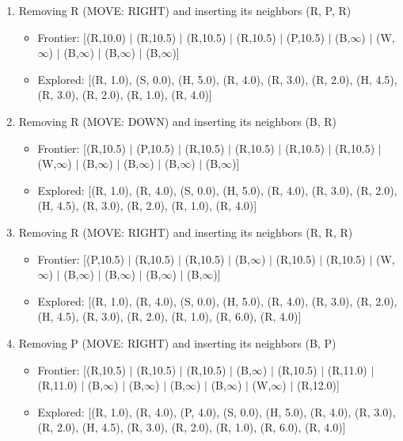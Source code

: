 \documentclass[12pt]{article}
\begin{document}
\begin{enumerate}
\item Removing R (MOVE: RIGHT) and inserting its neighbors (R, P, R)
\begin{itemize}
\item Frontier: [(R,10.0) \(|\) (R,10.5) \(|\) (R,10.5) \(|\) (R,10.5) \(|\) (P,10.5) \(|\) (B,\(\infty\)) \(|\) (W,\(\infty\)) \(|\) (B,\(\infty\)) \(|\) (B,\(\infty\)) \(|\) (B,\(\infty\))]
\item Explored: [(R, 1.0), (S, 0.0), (H, 5.0), (R, 4.0), (R, 3.0), (R, 2.0), (H, 4.5), (R, 3.0), (R, 2.0), (R, 1.0), (R, 4.0)]
\end{itemize}

\item Removing R (MOVE: DOWN) and inserting its neighbors (B, R)
\begin{itemize}
\item Frontier: [(R,10.5) \(|\) (P,10.5) \(|\) (R,10.5) \(|\) (R,10.5) \(|\) (R,10.5) \(|\) (R,10.5) \(|\) (W,\(\infty\)) \(|\) (B,\(\infty\)) \(|\) (B,\(\infty\)) \(|\) (B,\(\infty\)) \(|\) (B,\(\infty\))]
\item Explored: [(R, 1.0), (R, 4.0), (S, 0.0), (H, 5.0), (R, 4.0), (R, 3.0), (R, 2.0), (H, 4.5), (R, 3.0), (R, 2.0), (R, 1.0), (R, 4.0)]
\end{itemize}

\item Removing R (MOVE: RIGHT) and inserting its neighbors (R, R, R)
\begin{itemize}
\item Frontier: [(P,10.5) \(|\) (R,10.5) \(|\) (R,10.5) \(|\) (B,\(\infty\)) \(|\) (R,10.5) \(|\) (R,10.5) \(|\) (W,\(\infty\)) \(|\) (B,\(\infty\)) \(|\) (B,\(\infty\)) \(|\) (B,\(\infty\)) \(|\) (B,\(\infty\))]
\item Explored: [(R, 1.0), (R, 4.0), (S, 0.0), (H, 5.0), (R, 4.0), (R, 3.0), (R, 2.0), (H, 4.5), (R, 3.0), (R, 2.0), (R, 1.0), (R, 6.0), (R, 4.0)]
\end{itemize}

\item Removing P (MOVE: RIGHT) and inserting its neighbors (B, P)
\begin{itemize}
\item Frontier: [(R,10.5) \(|\) (R,10.5) \(|\) (R,10.5) \(|\) (B,\(\infty\)) \(|\) (R,10.5) \(|\) (R,11.0) \(|\) (R,11.0) \(|\) (B,\(\infty\)) \(|\) (B,\(\infty\)) \(|\) (B,\(\infty\)) \(|\) (B,\(\infty\)) \(|\) (W,\(\infty\)) \(|\) (R,12.0)]
\item Explored: [(R, 1.0), (R, 4.0), (P, 4.0), (S, 0.0), (H, 5.0), (R, 4.0), (R, 3.0), (R, 2.0), (H, 4.5), (R, 3.0), (R, 2.0), (R, 1.0), (R, 6.0), (R, 4.0)]
\end{itemize}


\end{enumerate}
\end{document}
